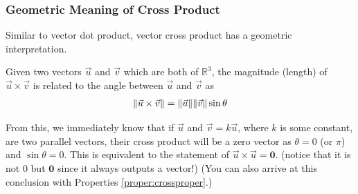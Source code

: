 \subsubsection{Geometric Meaning of Cross Product} Similar to vector dot product, vector cross product has a geometric interpretation.
\begin{proper}
\label{proper:crossgeo}
Given two vectors $\vec{u}$ and $\vec{v}$ which are both of $\mathbb{R}^3$, the magnitude (length) of $\vec{u} \times \vec{v}$ is related to the angle between $\vec{u}$ and $\vec{v}$ as
\begin{align}
\norm{\vec{u} \times \vec{v}} = \norm{\vec{u}}\norm{\vec{v}}\sin\theta \label{eqn:crossgeo}
\end{align}
\end{proper}
From this, we immediately know that if $\vec{u}$ and $\vec{v} = k\vec{u}$, where $k$ is some constant, are two parallel vectors, their cross product will be a zero vector as $\theta = 0$ (or $\pi$) and $\sin \theta = 0$. This is equivalent to the statement of $\vec{u} \times \vec{u} = \textbf{0}$.\footnotemark{} (notice that it is not $0$ but $\textbf{0}$ since it always outputs a vector!) (You can also arrive at this conclusion with Properties \ref{proper:crossproper}.)\footnotemark

